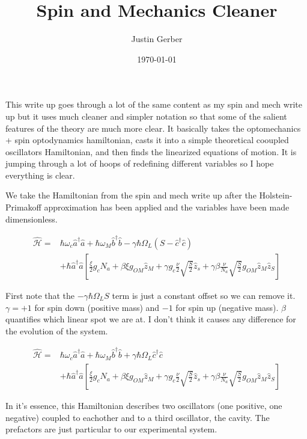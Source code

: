 \documentclass[12pt]{article}
\begin{document}
\title{Spin and Mechanics Cleaner}
\author{Justin Gerber}
\date{\today}
\maketitle

This write up goes through a lot of the same content as my spin and mech write up but it uses much cleaner and simpler notation so that some of the salient features of the theory are much more clear. It basically takes the optomechanics + spin optodynamics hamiltonian, casts it into a simple theoretical cooupled oscillators Hamiltonian, and then finds the linearized equations of motion. It is jumping through a lot of hoops of redefining different variables so I hope everything is clear.

We take the Hamiltonian from the spin and mech write up after the Holstein-Primakoff approximation has been applied and the variables have been made dimensionless.

\begin{align}
 \widehat{\mathcal{H}} =& 
\hbar \omega_c \hat{a}^{\dag} \hat{a} 
+ \hbar \omega_M \hat{b}^{\dag} \hat{b} 
- \gamma \hbar \Omega_L (S-\hat{c}^{\dag} \hat{c}) \\
&+ \hbar \hat{a}^{\dag} \hat{a} \left[
\frac{\xi}{2} g_c N_a 
+ \beta \xi g_{OM} \hat{z}_{M} 
+ \gamma g_c \frac{\nu}{2} \sqrt{\frac{S}{2}} \hat{z}_{s}
+ \gamma \beta \frac{\nu}{N_a} \sqrt{\frac{S}{2}} g_{OM} \hat{z}_{M} \hat{z}_{S}
\right]
\end{align}

First note that the $-\gamma \hbar \Omega_L S$ term is just a constant offset so we can remove it. $\gamma = +1$ for spin down (positive mass) and $-1$ for spin up (negative mass). $\beta$ quantifies which linear spot we are at. I don't think it causes any difference for the evolution of the system.

\begin{align}
 \widehat{\mathcal{H}} =& 
\hbar \omega_c \hat{a}^{\dag} \hat{a} 
+ \hbar \omega_M \hat{b}^{\dag} \hat{b} 
+ \gamma \hbar \Omega_L \hat{c}^{\dag} \hat{c} \\
&+ \hbar \hat{a}^{\dag} \hat{a} \left[
\frac{\xi}{2} g_c N_a 
+ \beta \xi g_{OM} \hat{z}_{M} 
+ \gamma g_c \frac{\nu}{2} \sqrt{\frac{S}{2}} \hat{z}_{s}
+ \gamma \beta \frac{\nu}{N_a} \sqrt{\frac{S}{2}} g_{OM} \hat{z}_{M} \hat{z}_{S}
\right]
\end{align}

In it's essence, this Hamiltonian describes two oscillators (one positive, one negative) coupled to eachother and to a third oscillator, the cavity. The prefactors are just particular to our experimental system.
\end{document}
